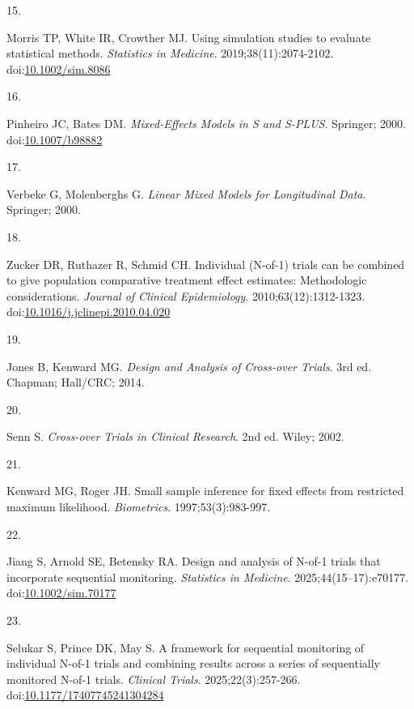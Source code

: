 \documentclass[
  11pt,
]{article}
\newlength{\cslhangindent}
\newlength{\csllabelwidth}
\newenvironment{CSLReferences}[2] %
 {\begin{list}{}{%
  \setlength{\itemindent}{0pt}
  \setlength{\leftmargin}{0pt}
  \setlength{\parsep}{0pt}
  \ifodd #1
   \setlength{\leftmargin}{\cslhangindent}
   \setlength{\itemindent}{-1\cslhangindent}
  \fi
  \setlength{\itemsep}{#2\baselineskip}}}
 {\end{list}}
\newcommand{\CSLLeftMargin}[1]{\parbox[t]{\csllabelwidth}{\strut#1\strut}}
\newcommand{\CSLRightInline}[1]{\parbox[t]{\linewidth - \csllabelwidth}{\strut#1\strut}}
\begin{document}
\begin{CSLReferences}{0}{1}
\CSLLeftMargin{15. }%
\CSLRightInline{Morris TP, White IR, Crowther MJ. Using simulation studies to evaluate statistical methods. \emph{Statistics in Medicine}. 2019;38(11):2074-2102. doi:\href{https://doi.org/10.1002/sim.8086}{10.1002/sim.8086}}

\CSLLeftMargin{16. }%
\CSLRightInline{Pinheiro JC, Bates DM. \emph{Mixed-Effects Models in {S} and {S-PLUS}}. Springer; 2000. doi:\href{https://doi.org/10.1007/b98882}{10.1007/b98882}}

\CSLLeftMargin{17. }%
\CSLRightInline{Verbeke G, Molenberghs G. \emph{Linear Mixed Models for Longitudinal Data}. Springer; 2000.}

\CSLLeftMargin{18. }%
\CSLRightInline{Zucker DR, Ruthazer R, Schmid CH. Individual ({N}-of-1) trials can be combined to give population comparative treatment effect estimates: Methodologic considerations. \emph{Journal of Clinical Epidemiology}. 2010;63(12):1312-1323. doi:\href{https://doi.org/10.1016/j.jclinepi.2010.04.020}{10.1016/j.jclinepi.2010.04.020}}

\CSLLeftMargin{19. }%
\CSLRightInline{Jones B, Kenward MG. \emph{Design and Analysis of Cross-over Trials}. 3rd ed. Chapman; Hall/CRC; 2014.}

\CSLLeftMargin{20. }%
\CSLRightInline{Senn S. \emph{Cross-over Trials in Clinical Research}. 2nd ed. Wiley; 2002.}

\CSLLeftMargin{21. }%
\CSLRightInline{Kenward MG, Roger JH. Small sample inference for fixed effects from restricted maximum likelihood. \emph{Biometrics}. 1997;53(3):983-997.}

\CSLLeftMargin{22. }%
\CSLRightInline{Jiang S, Arnold SE, Betensky RA. Design and analysis of {N}-of-1 trials that incorporate sequential monitoring. \emph{Statistics in Medicine}. 2025;44(15--17):e70177. doi:\href{https://doi.org/10.1002/sim.70177}{10.1002/sim.70177}}

\CSLLeftMargin{23. }%
\CSLRightInline{Selukar S, Prince DK, May S. A framework for sequential monitoring of individual {N}-of-1 trials and combining results across a series of sequentially monitored {N}-of-1 trials. \emph{Clinical Trials}. 2025;22(3):257-266. doi:\href{https://doi.org/10.1177/17407745241304284}{10.1177/17407745241304284}}

\end{CSLReferences}
\end{document}
